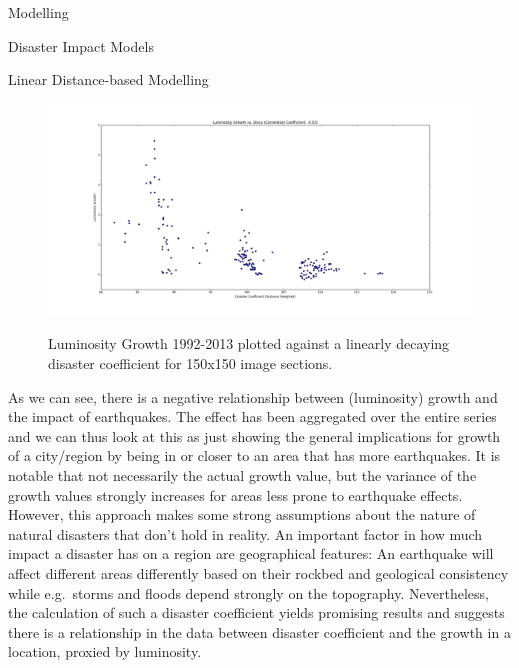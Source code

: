 \documentclass[12.5pt,fleqn,leqno,letterpaper]{article}
\begin{document}
\begin{section}{Modelling}
\begin{subsection}{Disaster Impact Models}
\begin{subsubsection}{Linear Distance-based Modelling}
      \begin{figure}
        \centering
        \includegraphics[width=1\linewidth]{linear-lum-vs-disco}\label{fig:linear-model-disco-vs-lum-growth}
        \caption{Luminosity Growth 1992-2013 plotted against a linearly decaying disaster coefficient for 150x150 image sections.}
      \end{figure}
      As we can see, there is a negative relationship between (luminosity) growth and the impact of earthquakes. The effect has been aggregated over the entire series and we can thus look at this as just showing the general implications for growth of a city/region by being in or closer to an area that has more earthquakes. It is notable that not necessarily the actual growth value, but the variance of the growth values strongly increases for areas less prone to earthquake effects.\\
      However, this approach makes some strong assumptions about the nature of natural disasters that don't hold in reality. An important factor in how much impact a disaster has on a region are geographical features: An earthquake will affect different areas differently based on their rockbed and geological consistency while e.g.\ storms and floods depend strongly on the topography. Nevertheless, the calculation of such a disaster coefficient yields promising results and suggests there is a relationship in the data between disaster coefficient and the growth in a location, proxied by luminosity.
    \end{subsubsection}


\end{subsection}
\end{section}
\end{document}
